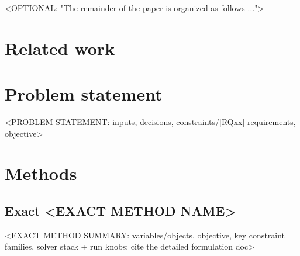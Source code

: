 \documentclass[11pt]{article}
\begin{document}
<OPTIONAL: "The remainder of the paper is organized as follows ...">

\section{Related work}


\section{Problem statement}
<PROBLEM STATEMENT: inputs, decisions, constraints/[RQxx] requirements, objective>

\section{Methods}

\subsection{Exact <EXACT METHOD NAME>}
<EXACT METHOD SUMMARY: variables/objects, objective, key constraint families,
solver stack + run knobs; cite the detailed formulation doc>
\end{document}
